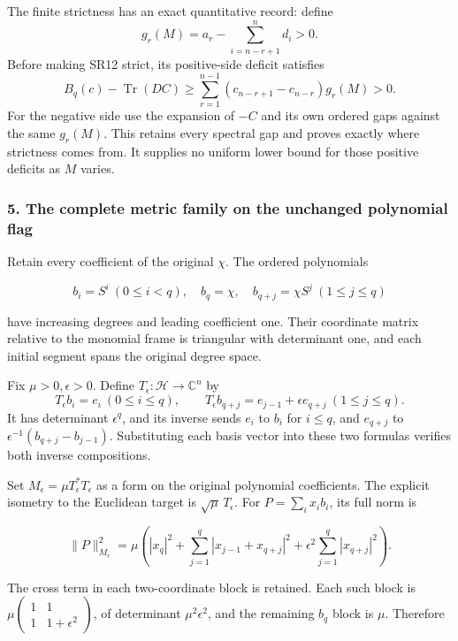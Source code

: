 The finite strictness has an exact quantitative record: define \[
g_r(M)=a_r-\sum_{i=n-r+1}^{n}d_i>0.
\tag{SR14}
\] Before making SR12 strict, its positive-side deficit satisfies \[
B_q(c)-\operatorname{Tr}(DC)
\ge\sum_{r=1}^{n-1}(c_{n-r+1}-c_{n-r})g_r(M)>0.
\tag{SR15}
\] For the negative side use the expansion of \(-C\) and its own ordered gaps against the same \(g_r(M)\). This retains every spectral gap and proves exactly where strictness comes from. It supplies no uniform lower bound for those positive deficits as \(M\) varies.

\subsubsection{5. The complete metric family on the unchanged polynomial flag}\label{endpoint-four_window_sharpness_review--the-complete-metric-family-on-the-unchanged-polynomial-flag}

Retain every coefficient of the original \(\chi\). The ordered polynomials

\[
b_i=S^i\ (0\le i<q),\quad b_q=\chi,\quad
b_{q+j}=\chi S^j\ (1\le j\le q)
\tag{SR16}
\]

have increasing degrees and leading coefficient one. Their coordinate matrix relative to the monomial frame is triangular with determinant one, and each initial segment spans the original degree space.

Fix \(\mu>0,\epsilon>0\). Define \(T_\epsilon:\mathcal H\to\mathbb C^n\) by \[
T_\epsilon b_i=e_i\ (0\le i\le q),\qquad
T_\epsilon b_{q+j}=e_{j-1}+\epsilon e_{q+j}\ (1\le j\le q).
\tag{SR17}
\] It has determinant \(\epsilon^q\), and its inverse sends \(e_i\) to \(b_i\) for \(i\le q\), and \(e_{q+j}\) to \(\epsilon^{-1}(b_{q+j}-b_{j-1})\). Substituting each basis vector into these two formulas verifies both inverse compositions.

Set \(M_\epsilon=\mu T_\epsilon^*T_\epsilon\) as a form on the original polynomial coefficients. The explicit isometry to the Euclidean target is \(\sqrt\mu\,T_\epsilon\). For \(P=\sum_i x_ib_i\), its full norm is

\[
\|P\|_{M_\epsilon}^2
=\mu\left(
|x_q|^2+\sum_{j=1}^q|x_{j-1}+x_{q+j}|^2
+\epsilon^2\sum_{j=1}^q|x_{q+j}|^2\right).
\tag{SR18}
\]

The cross term in each two-coordinate block is retained. Each such block is \(\mu\begin{pmatrix}1&1\\1&1+\epsilon^2\end{pmatrix}\), of determinant \(\mu^2\epsilon^2\), and the remaining \(b_q\) block is \(\mu\). Therefore

